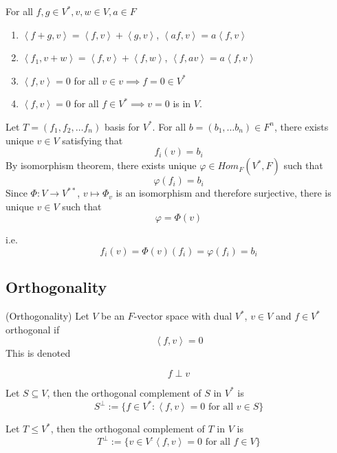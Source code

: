 \begin{proposition}
    For all $f, g \in V^*, v, w \in V, a \in F$
    \begin{enumerate}
        \item $\left<f + g, v\right> = \left<f, v\right> + \left<g, v\right>$, $\left<af, v\right> = a\left<f, v\right>$
        \item $\left<f_1, v + w\right> = \left<f, v\right> + \left<f,w\right>$, $\left<f, av\right> = a\left<f, v\right>$
        \item $\left<f, v\right> = 0$ for all $v \in v \implies f = 0 \in V^*$
        \item $\left<f, v\right> = 0$ for all $f \in V^* \implies v= 0$ is in $V$.
    \end{enumerate}
\end{proposition}

\begin{remark}
    Let $T = (f_1, f_2, \hdots f_n)$ basis for $V^*$. For all $b = (b_1,  \hdots b_n) \in F^n$, there exists unique $v \in V$ satisfying that 
    \[
    f_i (v) = b_i
    \]
    By isomorphism theorem, there exists unique $\varphi \in Hom_F(V^*, F)$ such that 
    \[
        \varphi(f_i) = b_i
    \]
    Since $ \Phi: V \to V^{**}$, $v \mapsto \Phi_v$ is an isomorphism and therefore surjective, there is unique $v \in V$ such that 
    \[
        \varphi = \Phi(v)
    \]

    i.e. 
    \[f_i(v) = \Phi(v) (f_i) = \varphi(f_i) = b_i
    \]
\end{remark}

\subsection{Orthogonality}

\begin{definition}(Orthogonality)
    Let $V$ be an $F$-vector space with dual $V^*$, $v \in V$ and $f \in V^*$ orthogonal if 
    \[
        \left< f, v \right> = 0
    \]
    This is denoted 

    \[
        f \perp v
    \]
\end{definition}

\begin{definition}
    Let $S \subseteq V$, then the orthogonal complement of $S$ in $V^*$ is 
    \[
        S^{\perp} := \{ f \in V^*: \left< f, v\right> = 0 \text{ for all } v \in S \} 
    \]

    Let $T \leq V^*$, then the orthogonal complement of $T$ in $V$ is
    \[
        T^{\perp} := \{ v \in V^: \left< f, v\right> = 0 \text{ for all } f \in V \} 
    \]
\end{definition}

